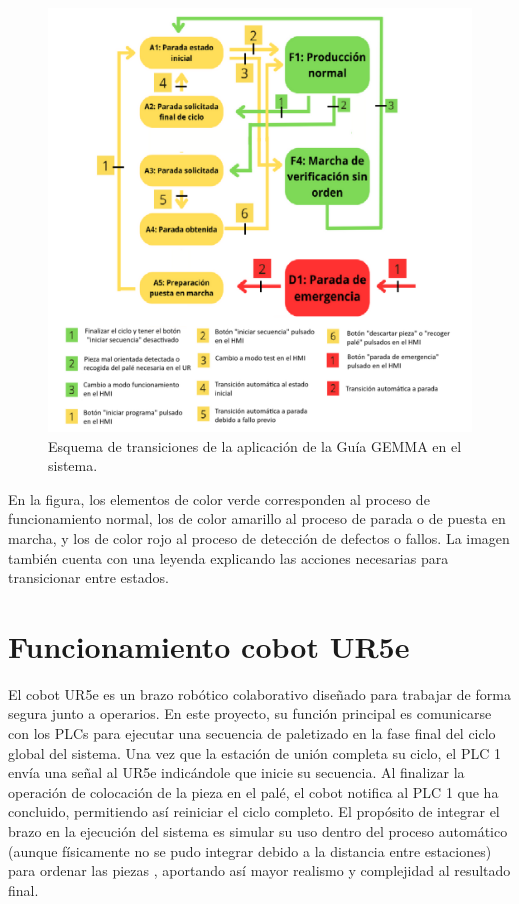 \clearpage

\begin{figure}[h!]
  \begin{center}
  	\includegraphics[width=16.5cm]{figs/guia_gemma_final}
  \end{center}
  \caption{\centering Esquema de transiciones de la aplicación de la Guía GEMMA en el sistema.}
  \label{fig:guia_gemma_final}
\end{figure}

En la figura, los elementos de color verde corresponden al proceso de funcionamiento normal, los de color amarillo al proceso de parada o de puesta en marcha, y los de color rojo al proceso de detección de defectos o fallos. La imagen también cuenta con una leyenda explicando las acciones necesarias para transicionar entre estados.

\clearpage

\section{Funcionamiento cobot UR5e}
\label{sec:funcionamiento_ur5e}

El cobot UR5e es un brazo robótico colaborativo diseñado para trabajar de forma segura junto a operarios. En este proyecto, su función principal es comunicarse con los PLCs para ejecutar una secuencia de paletizado en la fase final del ciclo global del sistema. Una vez que la estación de unión completa su ciclo, el PLC 1 envía una señal al UR5e indicándole que inicie su secuencia. Al finalizar la operación de colocación de la pieza en el palé, el cobot notifica al PLC 1 que ha concluido, permitiendo así reiniciar el ciclo completo. El propósito de integrar el brazo en la ejecución del sistema es simular su uso dentro del proceso automático (aunque físicamente no se pudo integrar debido a la distancia entre estaciones) para ordenar las piezas , aportando así mayor realismo y complejidad al resultado final. 

